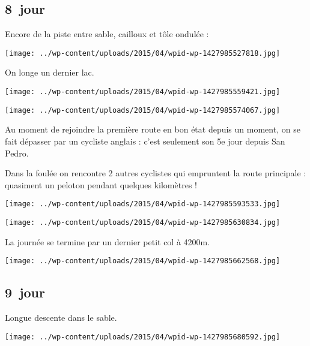  \subsection*{8\ieme\ jour} 

 Encore de la piste entre sable, cailloux et tôle ondulée :
\begin{center} \texttt{[image: ../wp-content/uploads/2015/04/wpid-wp-1427985527818.jpg]} \end{center}
\vspace{-\topsep}

\pagebreak
 On longe un dernier lac.
\begin{center} \texttt{[image: ../wp-content/uploads/2015/04/wpid-wp-1427985559421.jpg]} \end{center}
\begin{center} \texttt{[image: ../wp-content/uploads/2015/04/wpid-wp-1427985574067.jpg]} \end{center}

 Au moment de rejoindre la première route en bon état depuis un moment, on se fait dépasser par un cycliste anglais : c'est seulement son 5e jour depuis San Pedro. 

\pagebreak
 Dans la foulée on rencontre 2 autres cyclistes qui empruntent la route principale : quasiment un peloton pendant quelques kilomètres !
\begin{center} \texttt{[image: ../wp-content/uploads/2015/04/wpid-wp-1427985593533.jpg]} \end{center}
\begin{center} \texttt{[image: ../wp-content/uploads/2015/04/wpid-wp-1427985630834.jpg]} \end{center}
\vspace{-\topsep}
\vspace{-2.75mm}

\pagebreak
 La journée se termine par un dernier petit col à 4200m.
\begin{center} \texttt{[image: ../wp-content/uploads/2015/04/wpid-wp-1427985662568.jpg]} \end{center}

 \subsection*{9\ieme\ jour} 

 Longue descente dans le sable.
\begin{center} \texttt{[image: ../wp-content/uploads/2015/04/wpid-wp-1427985680592.jpg]} \end{center}
\vspace{-\topsep}

